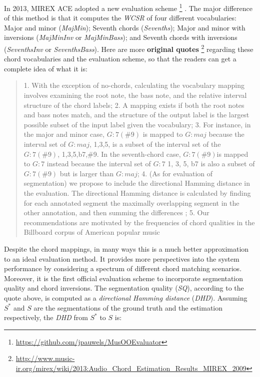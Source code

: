In 2013, MIREX ACE adopted a new evaluation scheme \footnote{\url{https://github.com/jpauwels/MusOOEvaluator}} \cite{pauwels2013evaluating}. The major difference of this method is that it computes the \textit{WCSR} of four different vocabularies: Major and minor ({\it MajMin}); Seventh chords ({\it Sevenths}); Major and minor with inversions ({\it MajMinInv} or {\it MajMinBass}); and Seventh chords with inversions ({\it SeventhsInv} or {\it SeventhsBass}). Here are more \textbf{original quotes} \footnote{\url{http://www.music-ir.org/mirex/wiki/2013:Audio\_Chord\_Estimation\_Results\_MIREX\_2009}} regarding these chord vocabularies and the evaluation scheme, so that the readers can get a complete idea of what it is:
\begin{quote}
1. With the exception of no-chords, calculating the vocabulary mapping involves examining the root note, the bass note, and the relative interval structure of the chord labels; 2. A mapping exists if both the root notes and bass notes match, and the structure of the output label is the largest possible subset of the input label given the vocabulary; 3. For instance, in the major and minor case, $G:7(\#9)$ is mapped to $G:maj$ because the interval set of $G:maj$, {1,3,5}, is a subset of the interval set of the $G:7(\#9)$, {1,3,5,b7,\#9}. In the seventh-chord case, $G:7(\#9)$is mapped to $G:7$ instead because the interval set of $G:7$ {1, 3, 5, b7} is also a subset of $G:7(\#9)$ but is larger than $G:maj$; 4. (As for evaluation of segmentation) we propose to include the directional Hamming distance in the evaluation. The directional Hamming distance is calculated by finding for each annotated segment the maximally overlapping segment in the other annotation, and then summing the differences \cite{abdallah2005theory,mauch2010automatic}; 5. Our recommendations are motivated by the frequencies of chord qualities in the Billboard corpus of American popular music \cite{burgoyne2011expert}
\end{quote}
Despite the chord mappings, in many ways this is a much better approximation to an ideal evaluation method. It provides more perspectives into the system performance by considering a spectrum of different chord matching scenarios. Moreover, it is the first official evaluation scheme to incorporate segmentation quality and chord inversions. The segmentation quality (\textit{SQ}), according to the quote above, is computed as a {\it directional Hamming distance} (\textit{DHD}). Assuming $S^*$ and $S$ are the segmentations of the ground truth and the estimation respectively, the \textit{DHD} from $S^*$ to $S$ is:

